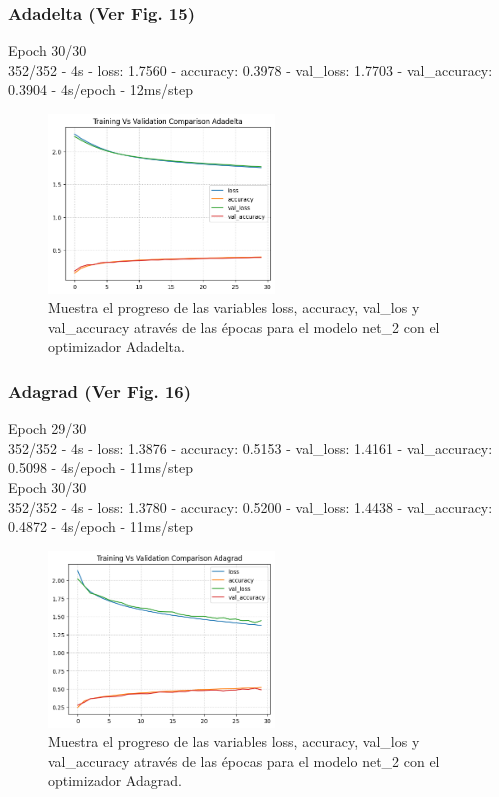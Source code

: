 \documentclass[journal]{IEEEtai}
\begin{document}
\subsubsection{\textbf{Adadelta} (Ver Fig. 15)} 
\hfill\break
Epoch 30/30\\
352/352 - 4s - loss: 1.7560 - accuracy: 0.3978 - val\_loss: 1.7703 - val\_accuracy: 0.3904 - 4s/epoch - 12ms/step

\begin{figure}[h!]
\centering
\includegraphics[width=6cm]{img/net2adadelta.png}
\caption{Muestra el progreso de las variables loss, accuracy, val\_los y val\_accuracy através de las épocas para el modelo net\_2 con el optimizador Adadelta.}
\label{fig: net2adadelta}
\end{figure}

\subsubsection{\textbf{Adagrad} (Ver Fig. 16)} 
\hfill\break
Epoch 29/30\\
352/352 - 4s - loss: 1.3876 - accuracy: 0.5153 - val\_loss: 1.4161 - val\_accuracy: 0.5098 - 4s/epoch - 11ms/step\\
Epoch 30/30\\
352/352 - 4s - loss: 1.3780 - accuracy: 0.5200 - val\_loss: 1.4438 - val\_accuracy: 0.4872 - 4s/epoch - 11ms/step

\begin{figure}[h!]
\centering
\includegraphics[width=6cm]{img/net2adagrad.png}
\caption{Muestra el progreso de las variables loss, accuracy, val\_los y val\_accuracy através de las épocas para el modelo net\_2 con el optimizador Adagrad.}
\label{fig: net2adagrad}
\end{figure}
\end{document}
